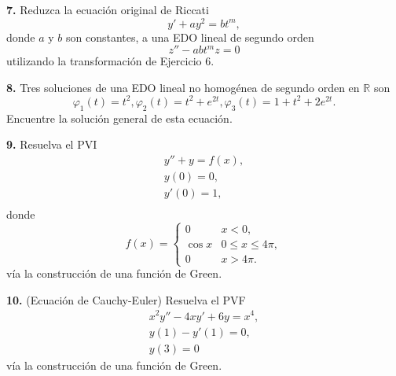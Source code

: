 \documentclass{article}
\newenvironment{statement}[1]{\smallskip\noindent\color[rgb]{1.00,0.00,0.50} {\bf #1.}}{}
\theoremstyle{definition}
\theoremstyle{remark}
\newcommand{\BR}{\mathbb R}
\begin{document}
\begin{statement}{7}
  Reduzca la ecuaci\'on original de Riccati
  \[
    y' + a y^2 = b t^m,  
  \]
  donde $a$ y $b$ son constantes, a una EDO lineal de segundo orden
  \[
    z'' - a b t^m z = 0  
  \]
  utilizando la transformaci\'on de Ejercicio 6.
\end{statement}

\begin{statement}{8}
  Tres soluciones de una EDO lineal no homog\'enea de segundo orden en $\BR$ son
  \[
    \varphi_1(t) = t^2,
    \varphi_2(t) = t^2 + e^{2t},
    \varphi_3(t) = 1 + t^2 + 2e^{2t}.  
  \]
  Encuentre la soluci\'on general de esta ecuaci\'on.
\end{statement}

\begin{statement}{9}
  Resuelva el PVI
  \begin{gather*}
    y'' + y = f(x),\\
    y(0) = 0,\\
    y'(0) = 1,\\
  \end{gather*}
  donde
  \[
    f(x) =
    \begin{cases}
      0 & x < 0,\\
      \cos x & 0 \leq x \leq 4 \pi,\\
      0 & x > 4 \pi.
    \end{cases}  
  \]
  v\'ia la construcci\'on de una funci\'on de Green.
\end{statement}

\begin{statement}{10}
  (Ecuaci\'on de Cauchy-Euler)
  Resuelva el PVF
  \begin{gather*}
    x^2 y'' - 4xy' + 6y = x^4,\\
    y(1) - y'(1) = 0,\\
    y(3) = 0
  \end{gather*}
  v\'ia la construcci\'on de una funci\'on de Green.
\end{statement}
\end{document}
